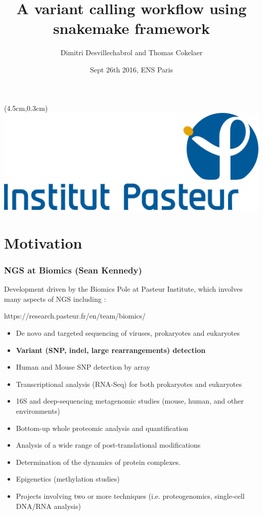\documentclass{beamer}
\title{A variant calling workflow using snakemake framework}
\author[D.Desvillechabrol \& T.Cokelaer]{Dimitri Desvillechabrol and Thomas Cokelaer}
\institute{Institut Pasteur}
\date{Sept 26th 2016, ENS Paris}
\begin{document}

\begin{frame}[plain]
    \titlepage
    \begin{textblock*}{5cm}(4.5cm,0.3cm)
        \includegraphics[scale=0.09]{images/Institut_Pasteur.png}
    \end{textblock*}
\end{frame}


\section{Motivation}

\begin{frame}
    \frametitle{NGS at Biomics (Sean Kennedy)}
 
 Development driven by the Biomics Pole at Pasteur Institute, which involves
 many aspects of NGS including :
 
 \tiny
 \begin{block}{https://research.pasteur.fr/en/team/biomics/}
  \begin{itemize}
  \item De novo and targeted sequencing of viruses, prokaryotes and eukaryotes
  \item \textbf{Variant (SNP, indel, large rearrangements) detection}
  \item Human and Mouse SNP detection by array
  \item Transcriptional analysis (RNA-Seq) for both prokaryotes and eukaryotes
  \item 16S and deep-sequencing metagenomic studies (mouse, human, and other environments)
  \item Bottom-up whole proteomic analysis and quantification
  \item Analysis of a wide range of post-translational modifications
  \item Determination of the dynamics of protein complexes.
  \item Epigenetics (methylation studies)
  \item Projects involving two or more techniques (i.e. proteogenomics, single-cell DNA/RNA analysis)
  \end{itemize}
 \end{block}
 \small 
\end{frame}
\end{document}
